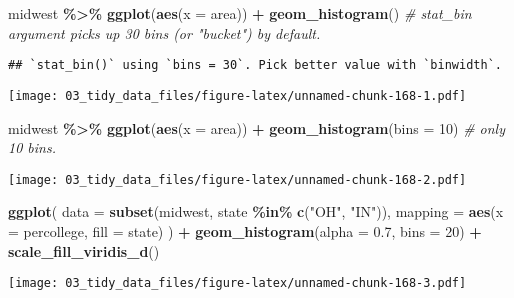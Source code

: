\documentclass[
]{book}
\newenvironment{Shaded}{\begin{snugshade}}{\end{snugshade}}
\newcommand{\CommentTok}[1]{\textcolor[rgb]{0.56,0.35,0.01}{\textit{#1}}}
\newcommand{\DataTypeTok}[1]{\textcolor[rgb]{0.13,0.29,0.53}{#1}}
\newcommand{\DecValTok}[1]{\textcolor[rgb]{0.00,0.00,0.81}{#1}}
\newcommand{\FloatTok}[1]{\textcolor[rgb]{0.00,0.00,0.81}{#1}}
\newcommand{\KeywordTok}[1]{\textcolor[rgb]{0.13,0.29,0.53}{\textbf{#1}}}
\newcommand{\NormalTok}[1]{#1}
\newcommand{\OperatorTok}[1]{\textcolor[rgb]{0.81,0.36,0.00}{\textbf{#1}}}
\newcommand{\StringTok}[1]{\textcolor[rgb]{0.31,0.60,0.02}{#1}}
\begin{document}
\begin{Shaded}
\begin{Highlighting}[]
\NormalTok{midwest }\OperatorTok{\%\textgreater{}\%}
\StringTok{  }\KeywordTok{ggplot}\NormalTok{(}\KeywordTok{aes}\NormalTok{(}\DataTypeTok{x =}\NormalTok{ area)) }\OperatorTok{+}
\StringTok{  }\KeywordTok{geom\_histogram}\NormalTok{() }\CommentTok{\# stat\_bin argument picks up 30 bins (or "bucket") by default.}
\end{Highlighting}
\end{Shaded}

\begin{verbatim}
## `stat_bin()` using `bins = 30`. Pick better value with `binwidth`.
\end{verbatim}

\texttt{[image: 03\_tidy\_data\_files/figure-latex/unnamed-chunk-168-1.pdf]}

\begin{Shaded}
\begin{Highlighting}[]
\NormalTok{midwest }\OperatorTok{\%\textgreater{}\%}
\StringTok{  }\KeywordTok{ggplot}\NormalTok{(}\KeywordTok{aes}\NormalTok{(}\DataTypeTok{x =}\NormalTok{ area)) }\OperatorTok{+}
\StringTok{  }\KeywordTok{geom\_histogram}\NormalTok{(}\DataTypeTok{bins =} \DecValTok{10}\NormalTok{) }\CommentTok{\# only 10 bins.}
\end{Highlighting}
\end{Shaded}

\texttt{[image: 03\_tidy\_data\_files/figure-latex/unnamed-chunk-168-2.pdf]}

\begin{Shaded}
\begin{Highlighting}[]
\KeywordTok{ggplot}\NormalTok{(}
  \DataTypeTok{data =} \KeywordTok{subset}\NormalTok{(midwest, state }\OperatorTok{\%in\%}\StringTok{ }\KeywordTok{c}\NormalTok{(}\StringTok{"OH"}\NormalTok{, }\StringTok{"IN"}\NormalTok{)),}
  \DataTypeTok{mapping =} \KeywordTok{aes}\NormalTok{(}\DataTypeTok{x =}\NormalTok{ percollege, }\DataTypeTok{fill =}\NormalTok{ state)}
\NormalTok{) }\OperatorTok{+}
\StringTok{  }\KeywordTok{geom\_histogram}\NormalTok{(}\DataTypeTok{alpha =} \FloatTok{0.7}\NormalTok{, }\DataTypeTok{bins =} \DecValTok{20}\NormalTok{) }\OperatorTok{+}
\StringTok{  }\KeywordTok{scale\_fill\_viridis\_d}\NormalTok{()}
\end{Highlighting}
\end{Shaded}

\texttt{[image: 03\_tidy\_data\_files/figure-latex/unnamed-chunk-168-3.pdf]}
\end{document}
